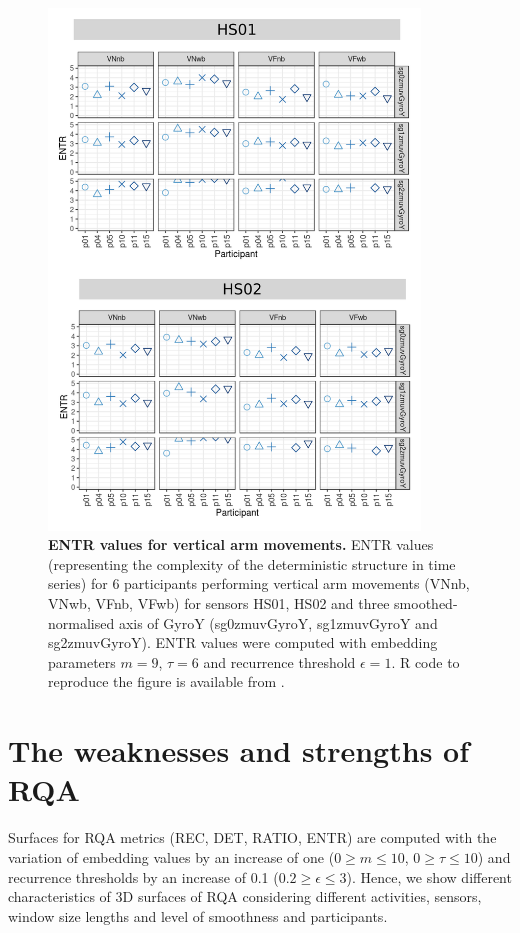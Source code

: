 \begin{figure}[!h]
\centering
\includegraphics[width=0.88\textwidth]{rqa_entr_V_w500}
    \caption{
	{\bf ENTR values for vertical arm movements.}	
	ENTR values (representing the complexity of the deterministic 
	structure in time series) for 
	6 participants performing vertical arm movements (VNnb, VNwb, VFnb, VFwb)
	for sensors HS01, HS02 and three smoothed-normalised axis 
	of GyroY (sg0zmuvGyroY, sg1zmuvGyroY and sg2zmuvGyroY).
	ENTR values were computed with 
	embedding parameters $m=9$, $\tau=6$ and recurrence threshold
	$\epsilon=1$.
	R code to reproduce the figure is available from \cite{hwum2018}.
        }
    \label{fig:rqa_entr_V}
\end{figure}



\section{The weaknesses and strengths of RQA}
Surfaces for RQA metrics (REC, DET, RATIO, ENTR) are computed with the 
variation of embedding values by an increase of one 
($0 \ge m \le 10$, $0 \ge \tau \le 10$) 
and recurrence thresholds by an increase of 0.1 ($0.2 \ge \epsilon \le 3$).
Hence, we show different characteristics of 3D surfaces of RQA considering 
different activities, sensors, window size lengths and level of smoothness 
and participants.

